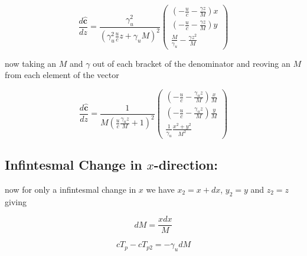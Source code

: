 \begin{equation}
	\frac{d\mathbf{\hat{c}}}{dz} = \frac{\gamma_u^2}{( \gamma_u^2 \frac{u}{c} z + \gamma_u M )^2}
	\begin{pmatrix}
		(- \frac{u}{c}  - \frac{\gamma z }{M}) x \\
		(-  \frac{u}{c}  - \frac{\gamma z }{M}) y \\
		   \frac{M}{\gamma_u}  -  \frac{\gamma z^2 }{M}
	\end{pmatrix}
\end{equation}

now taking an $M$ and $\gamma$ out of each bracket of the denominator and reoving an $M$ from each element of the vector

\begin{equation}
	\frac{d\mathbf{\hat{c}}}{dz} = \frac{1}{M
	(  \frac{u}{c} \frac{\gamma_u z}{M} +  1 )^2}
	\begin{pmatrix}
		( - \frac{u}{c}  - \frac{ \gamma_u z }{M} ) \frac{x}{M} \\
		( - \frac{u}{c}  - \frac{\gamma_u z }{M} ) \frac{y}{M} \\
		 \frac{1}{\gamma_u}\frac{ x^2 + y^2 }{M^2}
	\end{pmatrix}
\end{equation}

\subsection{Infintesmal Change in $x$-direction:}

now for only a infintesmal change in $x$ we have $x_2=x +dx$, $y_2=y$ and $z_2 = z$ giving

\begin{equation}
	dM = \frac{xdx}{M}
\end{equation}

\begin{equation}
	cT_{p} - cT_{p2} = - \gamma_u dM
\end{equation}


